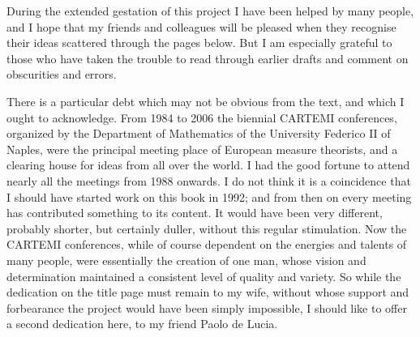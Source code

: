 During the extended gestation of this project I have been helped by many
people, and I hope that my friends and colleagues will be pleased when
they recognise their ideas scattered through the pages below.   But I am
especially grateful to those who have taken the trouble to read through
earlier drafts and comment on obscurities and errors.

There is a particular debt which may not be obvious from the text,
and which I ought to acknowledge.   
From 1984 to 2006 the biennial CARTEMI conferences, organized by the
Department of Mathematics of the University Federico II of Naples, were the
principal meeting place of European measure theorists, and a clearing house
for ideas from all over the world.   I had the good fortune to attend
nearly all the meetings from 1988 onwards.   I do not think it is a
coincidence that I should have started work on this book in 1992;  and from
then on every meeting has contributed something to its content.   It would
have been very different, probably shorter, but certainly duller, without
this regular stimulation.   Now the CARTEMI conferences, while of course
dependent on the energies and talents of many people, were essentially the
creation of one man, whose vision and determination maintained a consistent
level of quality and variety.   So while the dedication on the title page
must remain to my wife, without whose support and forbearance the project
would have been simply impossible, I should like to offer a second
dedication here, to my friend Paolo de Lucia.


     

     
